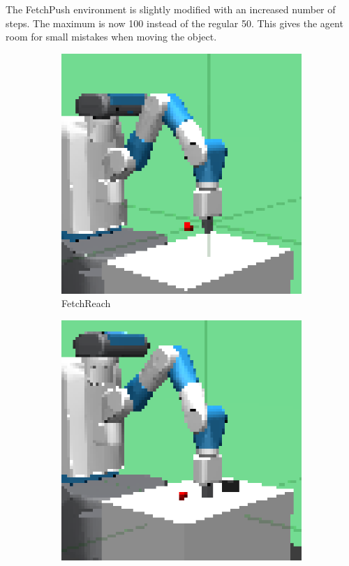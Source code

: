 The FetchPush environment is slightly modified with an increased number of steps. The maximum is now 100 instead of the regular 50. This gives the agent room for small mistakes when moving the object.
\begin{figure}[btp]
    \centering
    \begin{subfigure}[b]{.32\textwidth}
        \centering
        \includegraphics[width=\textwidth]{images/environments/fetch-reach-obs.png}
        \caption{FetchReach}
        \label{fig:envs:reach}
    \end{subfigure}
    \hfill
    \begin{subfigure}[b]{.32\textwidth}
        \centering
        \includegraphics[width=\textwidth]{images/environments/fetch-push-obs.png}

\end{subfigure}
\end{figure}
